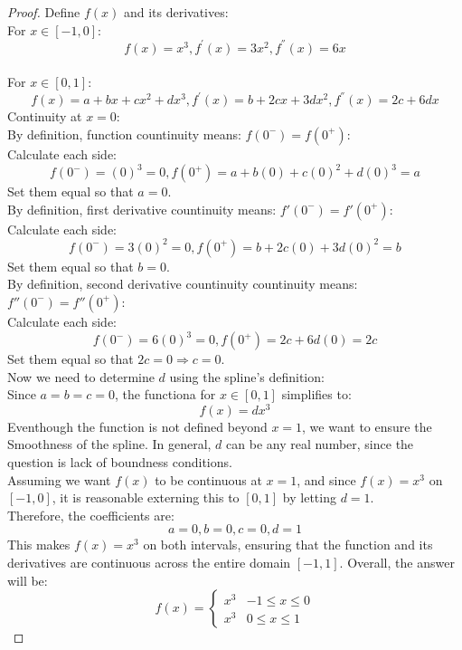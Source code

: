 \documentclass{article}
\begin{document}
\begin{proof}
    Define $f(x)$ and its derivatives:
    \\
    For $x \in [-1, 0]$:
    \[ f(x) = x^3, f^{'}(x) = 3x^2, f^{''}(x) = 6x \]
    \\
    For $x \in [0,1]$:
    \[ f(x) = a + bx + cx^2 + dx^3, f^{'}(x) = b + 2cx + 3dx^2, f^{''}(x) = 2c + 6dx \]
    Continuity at $x = 0$:
    \\
    By definition, function countinuity means: $f(0^{-}) = f(0^{+})$:
    \\
    Calculate each side:
    \[ f(0^{-}) = (0)^3 = 0, f(0^{+}) = a + b(0) + c(0)^2 + d(0)^3 = a \]
    Set them equal so that $a = 0$.
    \\
    By definition, first derivative countinuity means: $f{'}(0^{-}) = f{'}(0^{+})$:
    \\
    Calculate each side:
    \[ f(0^{-}) = 3(0)^2 = 0, f(0^{+}) = b + 2c(0) + 3d(0)^2 = b \]
    Set them equal so that $b = 0$.
    \\
    By definition, second derivative countinuity countinuity means: $f{''}(0^{-}) = f{''}(0^{+})$:
    \\
    Calculate each side:
    \[ f(0^{-}) = 6(0)^3 = 0, f(0^{+}) = 2c + 6d(0) = 2c \]
    Set them equal so that $2c = 0 \Rightarrow c = 0$.
    \\
    Now we need to determine $d$ using the spline's definition:
    \\
    Since $a = b = c = 0$, the functiona for $x \in [0,1]$ simplifies to:
    \[ f(x) = dx^3 \]
    Eventhough the function is not defined beyond $x = 1$, we want to ensure the Smoothness of the spline. 
    In general, $d$ can be any real number, since the question is lack of boundness conditions.
    \\
    Assuming we want $f(x)$ to be continuous at $x = 1$, and since $f(x) = x^3$ on $[-1, 0]$, it is reasonable externing this to $[0,1]$ by letting $d = 1$.
    \\
    Therefore, the coefficients are:
    \[ a = 0, b = 0, c = 0, d = 1 \]
    This makes $f(x) = x^3$ on both intervals, ensuring that the function and its derivatives are continuous across the entire domain $[-1, 1]$.
    Overall, the answer will be:
    \[f(x) = \begin{cases}
        x^3 & -1 \leq x \leq 0 \\
        x^3 & 0 \leq x \leq 1
    \end{cases}\]
\end{proof}
\end{document}
